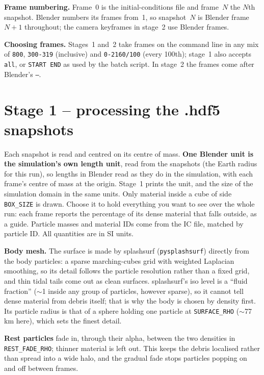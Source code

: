 \documentclass[11pt]{article}
\newcommand{\pc}[1]{\texttt{#1}}
\begin{document}
\textbf{Frame numbering.} Frame~0 is the initial-conditions file and frame~$N$ the $N$th snapshot. Blender numbers its frames from~1, so snapshot~$N$ is Blender frame~$N+1$ throughout; the camera keyframes in stage~2 use Blender frames.
 
\textbf{Choosing frames.} Stages~1 and~2 take frames on the command line in any mix of \pc{800}, \pc{300-319} (inclusive) and \pc{0-2160/100} (every 100th); stage~1 also accepts \pc{all}, or \pc{START END} as used by the batch script. In stage~2 the frames come after Blender's \pc{--}.
 
\section{Stage 1 -- processing the .hdf5 snapshots}
Each snapshot is read and centred on its centre of mass. \textbf{One Blender unit is the simulation's own length unit}, read from the snapshots (the Earth radius for this run), so lengths in Blender read as they do in the simulation, with each frame's centre of mass at the origin. Stage~1 prints the unit, and the size of the simulation domain in the same units. Only material inside a cube of side \pc{BOX\_SIZE} is drawn. Choose it to hold everything you want to see over the whole run: each frame reports the percentage of its dense material that falls outside, as a guide. Particle masses and material IDs come from the IC file, matched by particle ID. All quantities are in SI units.
 
\textbf{Body mesh.} The surface is made by splashsurf (\pc{pysplashsurf}) directly from the body particles: a sparse marching-cubes grid with weighted Laplacian smoothing, so its detail follows the particle resolution rather than a fixed grid, and thin tidal tails come out as clean surfaces. splashsurf's iso level is a ``fluid fraction'' ($\sim$1 inside any group of particles, however sparse), so it cannot tell dense material from debris itself; that is why the body is chosen by density first. Its particle radius is that of a sphere holding one particle at \pc{SURFACE\_RHO} ($\sim$77\,km here), which sets the finest detail.
 
\textbf{Rest particles} fade in, through their alpha, between the two densities in \pc{REST\_FADE\_RHO}; thinner material is left out. This keeps the debris localised rather than spread into a wide halo, and the gradual fade stops particles popping on and off between frames.
 
\end{document}
